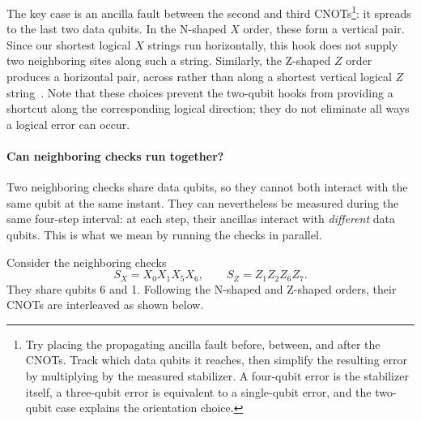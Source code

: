 \documentclass[11pt,a4paper]{article}
\begin{document}
The key case is an ancilla fault between the second and third CNOTs\footnote{Try placing the propagating ancilla fault before, between, and after the CNOTs. Track which data qubits it reaches, then simplify the resulting error by multiplying by the measured stabilizer. A four-qubit error is the stabilizer itself, a three-qubit error is equivalent to a single-qubit error, and the two-qubit case explains the orientation choice.}: it spreads to the last two data qubits. In the N-shaped $X$ order, these form a vertical pair. Since our shortest logical $X$ strings run horizontally, this hook does not supply two neighboring sites along such a string. Similarly, the Z-shaped $Z$ order produces a horizontal pair, across rather than along a shortest vertical logical $Z$ string~\cite{tomita}. Note that these choices prevent the two-qubit hooks from providing a shortcut along the corresponding logical direction; they do not eliminate all ways a logical error can occur.

\paragraph{Can neighboring checks run together?}

Two neighboring checks share data qubits, so they cannot both interact with the same qubit at the same instant. They can nevertheless be measured during the same four-step interval: at each step, their ancillas interact with \emph{different} data qubits. This is what we mean by running the checks in parallel.

Consider the neighboring checks
\[
S_X=X_0X_1X_5X_6,
\qquad
S_Z=Z_1Z_2Z_6Z_7.
\]
They share qubits 6 and 1. Following the N-shaped and Z-shaped orders, their CNOTs are interleaved as shown below.
\end{document}
